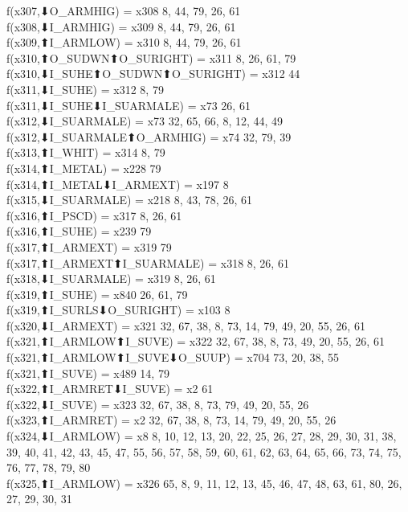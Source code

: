 f(x307,⬇O_ARMHIG) = x308 {8, 44, 79, 26, 61} \\
f(x308,⬇I_ARMHIG) = x309 {8, 44, 79, 26, 61} \\
f(x309,⬆I_ARMLOW) = x310 {8, 44, 79, 26, 61} \\
f(x310,⬆O_SUDWN⬆O_SURIGHT) = x311 {8, 26, 61, 79} \\
f(x310,⬇I_SUHE⬆O_SUDWN⬆O_SURIGHT) = x312 {44} \\
f(x311,⬇I_SUHE) = x312 {8, 79} \\
f(x311,⬇I_SUHE⬇I_SUARMALE) = x73 {26, 61} \\
f(x312,⬇I_SUARMALE) = x73 {32, 65, 66, 8, 12, 44, 49} \\
f(x312,⬇I_SUARMALE⬆O_ARMHIG) = x74 {32, 79, 39} \\
f(x313,⬆I_WHIT) = x314 {8, 79} \\
f(x314,⬆I_METAL) = x228 {79} \\
f(x314,⬆I_METAL⬇I_ARMEXT) = x197 {8} \\
f(x315,⬇I_SUARMALE) = x218 {8, 43, 78, 26, 61} \\
f(x316,⬆I_PSCD) = x317 {8, 26, 61} \\
f(x316,⬆I_SUHE) = x239 {79} \\
f(x317,⬆I_ARMEXT) = x319 {79} \\
f(x317,⬆I_ARMEXT⬆I_SUARMALE) = x318 {8, 26, 61} \\
f(x318,⬇I_SUARMALE) = x319 {8, 26, 61} \\
f(x319,⬆I_SUHE) = x840 {26, 61, 79} \\
f(x319,⬆I_SURLS⬇O_SURIGHT) = x103 {8} \\
f(x320,⬇I_ARMEXT) = x321 {32, 67, 38, 8, 73, 14, 79, 49, 20, 55, 26, 61} \\
f(x321,⬆I_ARMLOW⬆I_SUVE) = x322 {32, 67, 38, 8, 73, 49, 20, 55, 26, 61} \\
f(x321,⬆I_ARMLOW⬆I_SUVE⬇O_SUUP) = x704 {73, 20, 38, 55} \\
f(x321,⬆I_SUVE) = x489 {14, 79} \\
f(x322,⬆I_ARMRET⬇I_SUVE) = x2 {61} \\
f(x322,⬇I_SUVE) = x323 {32, 67, 38, 8, 73, 79, 49, 20, 55, 26} \\
f(x323,⬆I_ARMRET) = x2 {32, 67, 38, 8, 73, 14, 79, 49, 20, 55, 26} \\
f(x324,⬇I_ARMLOW) = x8 {8, 10, 12, 13, 20, 22, 25, 26, 27, 28, 29, 30, 31, 38, 39, 40, 41, 42, 43, 45, 47, 55, 56, 57, 58, 59, 60, 61, 62, 63, 64, 65, 66, 73, 74, 75, 76, 77, 78, 79, 80} \\
f(x325,⬆I_ARMLOW) = x326 {65, 8, 9, 11, 12, 13, 45, 46, 47, 48, 63, 61, 80, 26, 27, 29, 30, 31} \\

